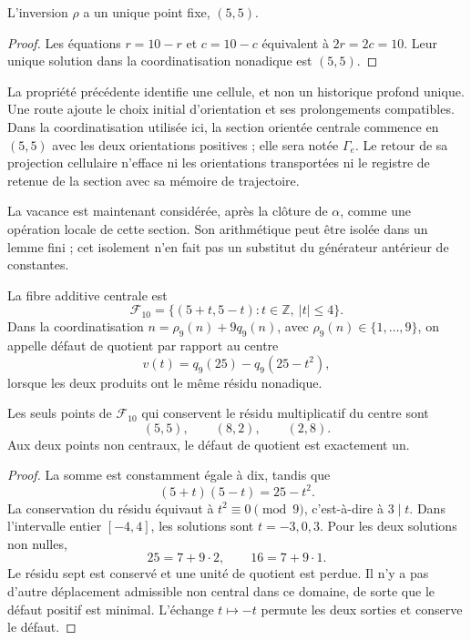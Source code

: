 \begin{proposition}
L'inversion \(\rho\) a un unique point fixe, \((5,5)\).
\end{proposition}
\begin{proof}
Les équations \(r=10-r\) et \(c=10-c\) équivalent à
\(2r=2c=10\). Leur unique solution dans la coordinatisation nonadique est \((5,5)\).
\end{proof}

La propriété précédente identifie une cellule, et non un historique profond
unique. Une route ajoute le choix initial d'orientation et ses
prolongements compatibles. Dans la coordinatisation utilisée ici, la section
orientée centrale commence en \((5,5)\) avec les deux orientations
positives ; elle sera notée \(\Gamma_e\). Le retour de sa projection
cellulaire n'efface ni les orientations transportées ni le registre de
retenue de la section avec sa mémoire de trajectoire.

La vacance est maintenant considérée, après la clôture de \(\alpha\), comme
une opération locale de cette section. Son arithmétique peut être isolée dans un
lemme fini ; cet isolement n'en fait pas un substitut du
générateur antérieur de constantes.

\begin{definition}
La fibre additive centrale est
\[
 \mathcal F_{10}
 =\{(5+t,5-t):t\in\mathbb Z,\ |t|\leq4\}.
\]
Dans la coordinatisation \(n=\rho_9(n)+9q_9(n)\), avec
\(\rho_9(n)\in\{1,\ldots,9\}\), on appelle défaut de quotient par rapport
au centre
\[
 v(t)=q_9(25)-q_9(25-t^2),
\]
lorsque les deux produits ont le même résidu nonadique.
\end{definition}

\begin{lemma}
Les seuls points de \(\mathcal F_{10}\) qui conservent le résidu
multiplicatif du centre sont
\[
 (5,5),\qquad (8,2),\qquad (2,8).
\]
Aux deux points non centraux, le défaut de quotient est exactement un.
\end{lemma}
\begin{proof}
La somme est constamment égale à dix, tandis que
\[
 (5+t)(5-t)=25-t^2.
\]
La conservation du résidu équivaut à \(t^2\equiv0\pmod9\), c'est-à-dire à \(3\mid t\). Dans l'intervalle entier \([-4,4]\), les solutions sont \(t=-3,0,3\). Pour les deux solutions non nulles,
\[
 25=7+9\cdot2,\qquad16=7+9\cdot1.
\]
Le résidu sept est conservé et une unité de quotient est perdue. Il n'y a
pas d'autre déplacement admissible non central dans ce domaine, de sorte que le
défaut positif est minimal. L'échange \(t\mapsto-t\) permute les
deux sorties et conserve le défaut.
\end{proof}

